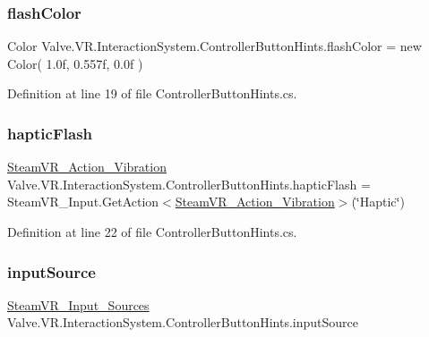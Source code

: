 \subsubsection{\texorpdfstring{flashColor}{flashColor}}
{\footnotesize\ttfamily Color Valve.\+V\+R.\+Interaction\+System.\+Controller\+Button\+Hints.\+flash\+Color = new Color( 1.\+0f, 0.\+557f, 0.\+0f )}



Definition at line 19 of file Controller\+Button\+Hints.\+cs.

\mbox{\label{class_valve_1_1_v_r_1_1_interaction_system_1_1_controller_button_hints_ad0fb27da7be6a805617634f7075e794a}} 
\subsubsection{\texorpdfstring{hapticFlash}{hapticFlash}}
{\footnotesize\ttfamily \mbox{\hyperlink{class_valve_1_1_v_r_1_1_steam_v_r___action___vibration}{Steam\+V\+R\+\_\+\+Action\+\_\+\+Vibration}} Valve.\+V\+R.\+Interaction\+System.\+Controller\+Button\+Hints.\+haptic\+Flash = Steam\+V\+R\+\_\+\+Input.\+Get\+Action$<$\mbox{\hyperlink{class_valve_1_1_v_r_1_1_steam_v_r___action___vibration}{Steam\+V\+R\+\_\+\+Action\+\_\+\+Vibration}}$>$(\char`\"{}Haptic\char`\"{})}



Definition at line 22 of file Controller\+Button\+Hints.\+cs.

\mbox{\label{class_valve_1_1_v_r_1_1_interaction_system_1_1_controller_button_hints_a0058edfb7a42d2c89bb8b713c1df5fca}} 
\subsubsection{\texorpdfstring{inputSource}{inputSource}}
{\footnotesize\ttfamily \mbox{\hyperlink{namespace_valve_1_1_v_r_a82e5bf501cc3aa155444ee3f0662853f}{Steam\+V\+R\+\_\+\+Input\+\_\+\+Sources}} Valve.\+V\+R.\+Interaction\+System.\+Controller\+Button\+Hints.\+input\+Source\hspace{0.3cm}{\ttfamily [protected]}}



